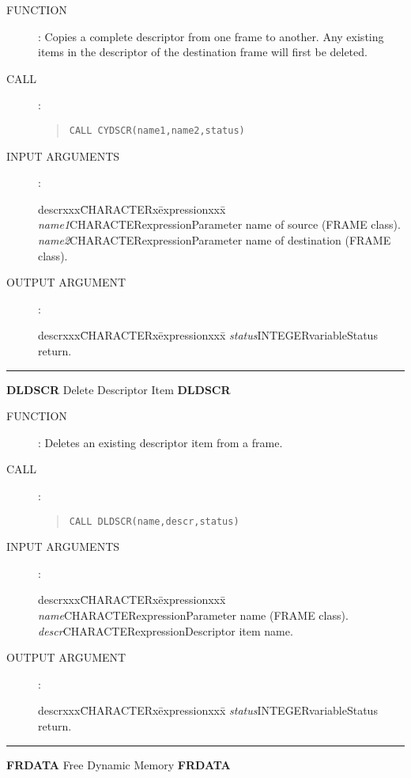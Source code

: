 \documentclass{article}
\begin{document}
\begin{description}
\item [FUNCTION]:
Copies a complete descriptor from one frame to another.
Any existing items in the descriptor of the destination frame will first be
deleted.
\item [CALL]:
\begin{quote}
{\tt CALL CYDSCR(name1,name2,status)}
\end{quote}
\item [INPUT ARGUMENTS]:
\begin{tabbing}
descrxxx\=CHARACTERx\=expressionxxx\=\kill
{\em name1}\>CHARACTER\>expression\>Parameter name of source (FRAME class).\\
{\em name2}\>CHARACTER\>expression\>Parameter name of destination (FRAME class).
\end{tabbing}
\item [OUTPUT ARGUMENT]:
\begin{tabbing}
descrxxx\=CHARACTERx\=expressionxxx\=\kill
{\em status}\>INTEGER\>variable\>Status return.
\end{tabbing}
\end{description}
\rule{\textwidth}{0.3mm}
{\Large {\bf DLDSCR} \hfill Delete Descriptor Item \hfill {\bf DLDSCR}}
\begin{description}
\item [FUNCTION]:
Deletes an existing descriptor item from a frame.
\item [CALL]:
\begin{quote}
{\tt CALL DLDSCR(name,descr,status)}
\end{quote}
\item [INPUT ARGUMENTS]:
\begin{tabbing}
descrxxx\=CHARACTERx\=expressionxxx\=\kill
{\em name}\>CHARACTER\>expression\>Parameter name (FRAME class).\\
{\em descr}\>CHARACTER\>expression\>Descriptor item name.
\end{tabbing}
\item [OUTPUT ARGUMENT]:
\begin{tabbing}
descrxxx\=CHARACTERx\=expressionxxx\=\kill
{\em status}\>INTEGER\>variable\>Status return.
\end{tabbing}
\end{description}
\rule{\textwidth}{0.3mm}
{\Large {\bf FRDATA} \hfill Free Dynamic Memory \hfill {\bf FRDATA}}
\end{document}
